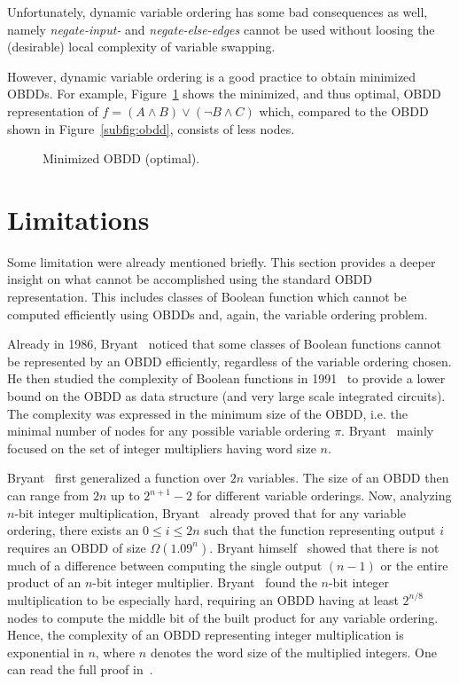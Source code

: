 \documentclass{vldb}
\begin{document}
Unfortunately, dynamic variable ordering has some bad consequences as well, namely
\textit{negate-input-} and \textit{negate-else-edges} cannot be used without
loosing the (desirable) local complexity of variable swapping.

However, dynamic variable ordering is a good practice to obtain minimized OBDDs.
For example, Figure~\ref{fig:min-obdd} shows the minimized, and thus optimal, OBDD
representation of \newline
$f=\left(A \land B\right) \lor \left(\neg B \land C\right)$ which, compared to
the OBDD shown in Figure~\ref{subfig:obdd}, consists of less nodes.

\begin{figure}[ht]
    \centering
    
    \caption{Minimized OBDD (optimal).}
    \label{fig:min-obdd}
\end{figure}

\section{Limitations}
\label{sec:limitations}

Some limitation were already mentioned briefly. This section provides a deeper
insight on what cannot be accomplished using the standard OBDD representation.
This includes classes of Boolean function which cannot be computed efficiently
using OBDDs and, again, the variable ordering problem.

Already in 1986, Bryant~\cite{BRYANT86} noticed that some classes of Boolean
functions cannot be represented by an OBDD efficiently, regardless of the variable
ordering chosen. He then studied the complexity of Boolean functions in
1991~\cite{BRYANT91} to provide a lower bound on the OBDD as data structure (and
very large scale integrated circuits). The complexity was expressed in the minimum
size of the OBDD, i.e. the minimal number of nodes for any possible variable
ordering $\pi$. Bryant~\cite{BRYANT91} mainly focused on the set of integer
multipliers having word size $n$.

Bryant~\cite{BRYANT91} first generalized a function over $2n$ variables. The size
of an OBDD then can range from $2n$ up to $2^{n+1}-2$ for different variable
orderings. Now, analyzing $n$-bit integer multiplication, Bryant~\cite{BRYANT86}
already proved that for any variable ordering, there exists an $0 \le i \le 2n$
such that the function representing output $i$ requires an OBDD of size
$\Omega(1.09^n)$. Bryant himself~\cite{BRYANT91} showed that there is not much
of a difference between computing the single output $(n-1)$ or the entire product
of an $n$-bit integer multiplier. Bryant~\cite{BRYANT91} found the $n$-bit integer
multiplication to be especially hard, requiring an OBDD having at least $2^{n/8}$
nodes to compute the middle bit of the built product for any variable ordering.
Hence, the complexity of an OBDD representing integer multiplication is
exponential in $n$, where $n$ denotes the word size of the multiplied integers.
One can read the full proof in~\cite{BRYANT91}.
\end{document}
